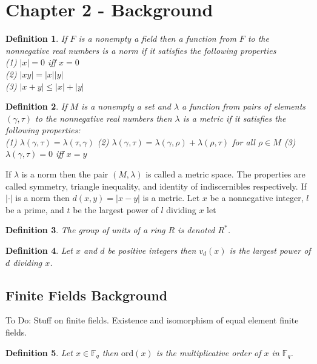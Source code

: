 \documentclass[a4paper]{article}
\newtheorem{mydef}{Definition}
\def\Fq {{ \mathbb{F} _ {q} }}
\def\ord {{ \mathrm{ord} }}
\begin{document}
\section{Chapter 2 - Background}

\begin{mydef}
If $F$ is a nonempty a field then  a function from $F$ to the nonnegative real numbers is a norm if it satisfies the following properties \\
(1) $|x|=0$ iff $x=0$ \\
(2) $|xy|=|x||y|$ \\
(3) $|x+y| \leq |x|+|y|$
\end{mydef}

\begin{mydef}
If $M$ is a nonempty a set and $\lambda$ a function from pairs of elements $(\gamma, \tau)$ to the nonnegative real numbers then $\lambda$ is a metric if it satisfies the following properties: \\
(1) $\lambda(\gamma,\tau)=\lambda(\tau,\gamma)$
(2) $\lambda(\gamma, \tau)=\lambda(\gamma,\rho)+\lambda(\rho, \tau)$ for all $\rho \in M$
(3) $\lambda(\gamma, \tau)=0$ iff $x=y$
\end{mydef}

If $\lambda$ is a norm then the pair $(M, \lambda)$ is called a metric space. The properties are called symmetry, triangle inequality, and identity of indiscernibles respectively. If $|\cdot|$ is a norm then $d(x, y) = |x-y|$ is a metric. Let $x$ be a nonnegative integer, $l$ be a prime, and $t$ be the largest power of $l$ dividing $x$ let

\begin{mydef}
The group of units of a ring $R$ is denoted $R^*$.
\end{mydef}

\begin{mydef} 
Let $x$ and $d$ be positive integers then $v_d(x)$ is the largest power of $d$ dividing $x$.
\end{mydef}

\subsection{Finite Fields Background}

To Do: Stuff on finite fields. Existence and isomorphism of equal element finite fields. \\

\begin{mydef} 
Let $x \in \Fq$ then $\ord(x)$ is the multiplicative order of $x$ in $\Fq$.
\end{mydef}
\end{document}
